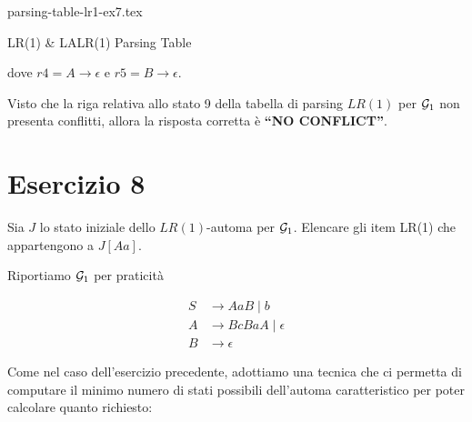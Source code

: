 \documentclass[class=book, crop=false, oneside, 12pt]{standalone}
\begin{document}
\begin{table}[H]
    \centering
    {parsing-table-lr1-ex7.tex}
    \caption{LR(1) \& LALR(1) Parsing Table}
    \label{tab:parsing-table-lr1-ex7}
\end{table}
dove \(r4 =  A \to \epsilon\) e \(r5 =  B \to \epsilon\).

Visto che la riga relativa allo stato 9 della tabella di parsing \(LR(1)\) per \(\mathcal{G}_1\) non presenta conflitti, allora la risposta corretta è \textbf{“NO CONFLICT”}.

\section*{Esercizio 8}

Sia \(J\) lo stato iniziale dello \(LR(1)\)-automa per \(\mathcal{G}_1\). Elencare gli item LR(1) che appartengono a \(J[Aa]\).

Riportiamo \(\mathcal{G}_1\) per praticità

\begin{align*}
    S &\to AaB \mid b \\
    A &\to BcBaA \mid \epsilon \\
    B &\to \epsilon
\end{align*}

Come nel caso dell'esercizio precedente, adottiamo una tecnica che ci permetta di computare il minimo numero di stati possibili dell'automa caratteristico per poter calcolare quanto richiesto:
\end{document}
